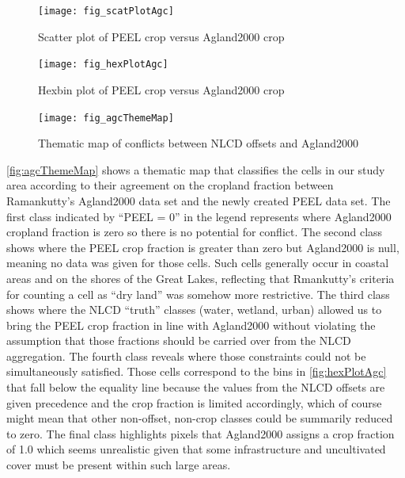 \begin{figure}[hpt] 
  \centering



    \texttt{[image: fig\_scatPlotAgc]}
  \caption{Scatter plot of PEEL crop versus Agland2000 crop}
  \label{fig:scatPlotAgc} 
\end{figure} 


\begin{figure}[hpt] 
  \centering

    \texttt{[image: fig\_hexPlotAgc]}
  \caption{Hexbin plot of PEEL crop versus Agland2000 crop}
  \label{fig:hexPlotAgc} 
\end{figure} 



\begin{figure} 
  \centering


    \texttt{[image: fig\_agcThemeMap]}
  \caption{Thematic map of conflicts between NLCD offsets and Agland2000}
  \label{fig:agcThemeMap} 
\end{figure} 


\autoref{fig:agcThemeMap} shows a thematic map that classifies the
cells in our study area according to their agreement on the cropland
fraction between Ramankutty's Agland2000 data set and the newly
created PEEL data set.  The first class indicated by ``PEEL = 0'' in
the legend represents where Agland2000 cropland fraction is zero so
there is no potential for conflict.  The second class shows where the
PEEL crop fraction is greater than zero but Agland2000 is null,
meaning no data was given for those cells.  Such cells generally occur
in coastal areas and on the shores of the Great Lakes, reflecting that
Rmankutty's criteria for counting a cell as ``dry land'' was somehow
more restrictive.  The third class shows where the NLCD ``truth''
classes (water, wetland, urban) allowed us to bring the PEEL crop
fraction in line with Agland2000 without violating the assumption that
those fractions should be carried over from the NLCD aggregation.  The
fourth class reveals where those constraints could not be
simultaneously satisfied.  Those cells correspond to the bins in
\autoref{fig:hexPlotAgc} that fall below the equality line because the
values from the NLCD offsets are given precedence and the crop
fraction is limited accordingly, which of course might mean that other
non-offset, non-crop classes could be summarily reduced to zero.  The
final class highlights pixels that Agland2000 assigns a crop fraction
of 1.0 which seems unrealistic given that some infrastructure and
uncultivated cover must be present within such large areas.

